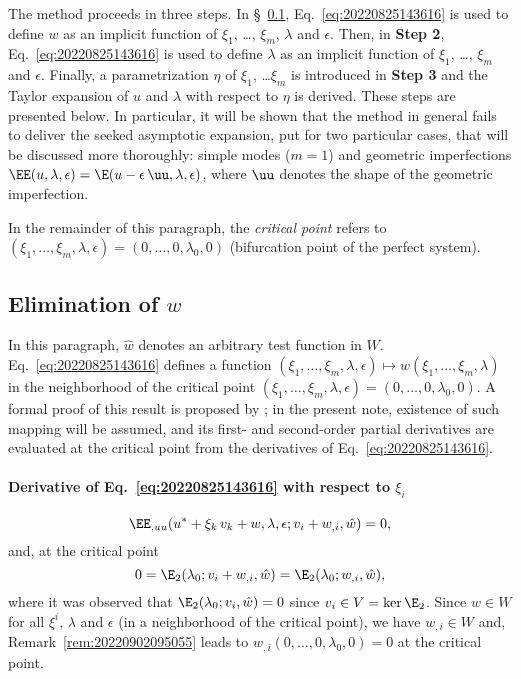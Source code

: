 The method proceeds in three steps. In \S~\ref{sec:20221020140204}, Eq.~\eqref{eq:20220825143616} is used to define $w$
as an implicit function of $\xi_1$, \dots, $\xi_m$, $\lambda$ and \(\epsilon\). Then, in \textbf{Step 2},
Eq.~\eqref{eq:20220825143616} is used to define $\lambda$ as an implicit function of $\xi_1$, \dots, $\xi_m$ and
\(\epsilon\). Finally, a parametrization $\eta$ of $\xi_1$, \dots $\xi_m$ is introduced in \textbf{Step 3} and the
Taylor expansion of $u$ and $\lambda$ with respect to $\eta$ is derived. These steps are presented below. In particular,
it will be shown that the method in general fails to deliver the seeked asymptotic expansion, put for two particular
cases, that will be discussed more thoroughly: simple modes (\(m = 1\)) and geometric imperfections
\(\EE(u, \lambda, \epsilon) = \E(u - \epsilon \, \uu, \lambda, \epsilon)\), where \(\uu\) denotes the shape of the
geometric imperfection.

In the remainder of this paragraph, the \emph{critical point} refers to
\((\xi_1, \ldots, \xi_m, \lambda, \epsilon) = (0, \ldots, 0, \lambda_0, 0)\) (bifurcation point of the perfect system).

\subsection{Elimination of \(w\)}
\label{sec:20221020140204}

In this paragraph, $\hat{w}$ denotes an arbitrary test function in $W$. Eq.~\eqref{eq:20220825143616} defines a function
$(\xi_1, \ldots, \xi_m, \lambda, \epsilon) \mapsto w(\xi_1, \ldots, \xi_m, \lambda)$ in the neighborhood of the critical point
$(\xi_1, \ldots, \xi_m, \lambda, \epsilon) = (0, \ldots, 0, \lambda_0, 0)$. A formal proof of this result is proposed by \textcite{poti1987}; in the
present note, existence of such mapping will be assumed, and its first- and second-order partial derivatives are
evaluated at the critical point from the derivatives of Eq.~\eqref{eq:20220825143616}.

\paragraph{Derivative of Eq.~\eqref{eq:20220825143616} with respect to \(\xi_i\)}
\begin{equation}
  \label{eq:20220826140926}
  \EE_{,uu}(u^\ast + \xi_k \, v_k + w, \lambda, \epsilon; v_i + w_{,i}, \hat{w}) = 0,
\end{equation}
and, at the critical point
\begin{equation}
  \label{eq:20220825150219}
  0 = \E_2(\lambda_0; v_i + w_{,i}, \hat{w}) = \E_2(\lambda_0; w_{,i}, \hat{w}),
\end{equation}
where it was observed that \(\E_2(\lambda_0; v_i, \hat{w}) = 0\) since \(v_i \in V = \ker \E_2\). Since $w \in W$ for all
$\xi^i$, $\lambda$ and \(\epsilon\) (in a neighborhood of the critical point), we have $w_{,i} \in W$ and,
Remark~\ref{rem:20220902095055} leads to $w_{,i}(0, \ldots, 0, \lambda_0, 0) = 0$ at the critical point.

